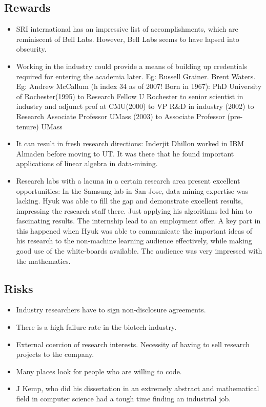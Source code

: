 \documentclass[oneside, article]{memoir}
\begin{document}
\subsection{Rewards}
\begin{itemize}
\item SRI international has an impressive list of accomplishments, which are reminiscent of Bell Labs. However, Bell Labs seems to have lapsed into obscurity.
\item Working in the industry could provide a means of building up credentials required for entering the academia later. 
\subitem Eg: Russell Grainer. Brent Waters.
\subitem Eg: Andrew McCallum (h index 34 as of 2007! Born in 1967): PhD University of Rochester(1995) to Research Fellow U Rochester to senior scientist in industry and adjunct prof at CMU(2000) to VP R\&D in industry (2002) to Research Associate Professor UMass (2003) to Associate Professor (pre-tenure) UMass

\item It can result in fresh research directions:
\subitem Inderjit Dhillon worked in IBM Almaden before moving to UT. It was there that he found important applications of linear algebra in data-mining.
\item Research labs with a lacuna in a certain research area present excellent opportunities:
\subitem In the Samsung lab in San Jose, data-mining expertise was lacking. Hyuk was able to fill the gap and demonstrate excellent results, impressing the research staff there. Just applying his algorithms led him to fascinating results. The internship lead to an employment offer. A key part in this happened when Hyuk was able to communicate the important ideas of his research to the non-machine learning audience effectively, while making good use of the white-boards available. The audience was very impressed with the mathematics.
\end{itemize}

\subsection{Risks}
\begin{itemize}
\item Industry researchers have to sign non-disclosure agreements.
\item There is a high failure rate in the biotech industry.
\item External coercion of research interests. Necessity of having to sell research projects to the company.
\item Many places look for people who are willing to code.
\item J Kemp, who did his dissertation in an extremely abstract and mathematical field in computer science had a tough time finding an industrial job.
\end{itemize}
\end{document}
